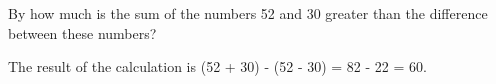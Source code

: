 
\begin{question}
By how much is the sum of the numbers 52 and 30 greater than
the difference between these numbers?
\end{question}

\begin{solution}
The result of the calculation is (52 + 30) -
(52 - 30) = 82 - 22 = 60.
\end{solution}

